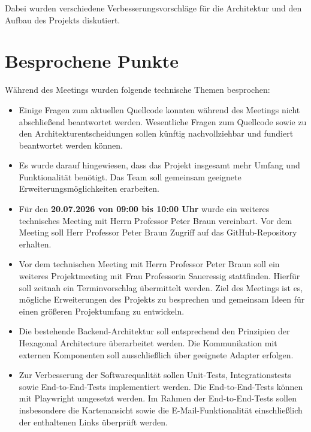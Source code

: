 \documentclass[a4paper,11pt]{article}
\begin{document}
Dabei wurden verschiedene Verbesserungsvorschläge für die Architektur und den Aufbau des Projekts diskutiert.

\vspace{0.5cm}

\section{Besprochene Punkte}

Während des Meetings wurden folgende technische Themen besprochen:

\begin{itemize}[leftmargin=1.2cm]

\item Einige Fragen zum aktuellen Quellcode konnten während des Meetings nicht abschließend beantwortet werden. 
Wesentliche Fragen zum Quellcode sowie zu den Architekturentscheidungen sollen künftig nachvollziehbar und fundiert beantwortet werden können.

\item Es wurde darauf hingewiesen, dass das Projekt insgesamt mehr Umfang und Funktionalität benötigt.
Das Team soll gemeinsam geeignete Erweiterungsmöglichkeiten erarbeiten.

\item Für den \textbf{20.07.2026 von 09:00 bis 10:00 Uhr} wurde ein weiteres technisches Meeting mit Herrn Professor Peter Braun vereinbart. 
Vor dem Meeting soll Herr Professor Peter Braun Zugriff auf das GitHub-Repository erhalten. 

\item Vor dem technischen Meeting mit Herrn Professor Peter Braun soll ein weiteres Projektmeeting mit Frau Professorin Saueressig stattfinden.
Hierfür soll zeitnah ein Terminvorschlag übermittelt werden.
Ziel des Meetings ist es, mögliche Erweiterungen des Projekts zu besprechen und gemeinsam Ideen für einen größeren Projektumfang zu entwickeln.

\item Die bestehende Backend-Architektur soll entsprechend den Prinzipien der Hexagonal Architecture überarbeitet werden.
Die Kommunikation mit externen Komponenten soll ausschließlich über geeignete Adapter erfolgen.

\item Zur Verbesserung der Softwarequalität sollen Unit-Tests, Integrationstests sowie End-to-End-Tests implementiert werden.
Die End-to-End-Tests können mit Playwright umgesetzt werden.
Im Rahmen der End-to-End-Tests sollen insbesondere die Kartenansicht sowie die E-Mail-Funktionalität einschließlich der enthaltenen Links überprüft werden.

\end{itemize}
\end{document}

